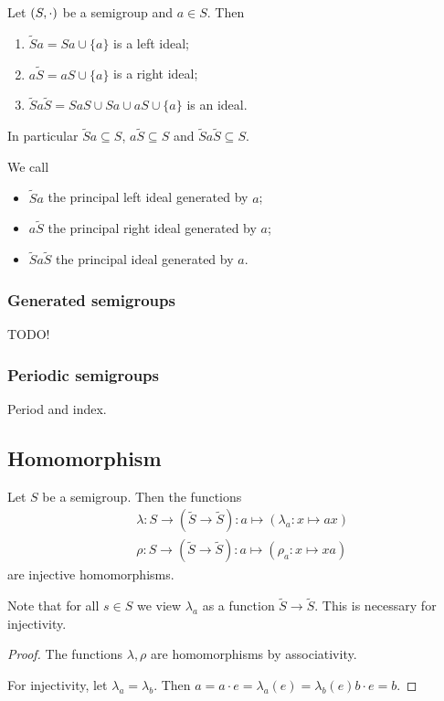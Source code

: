 \begin{lemma}
Let $\left( S,\cdot \right)$ be a semigroup and $a\in S$. Then
\begin{enumerate}
\item $\widetilde{S}a = Sa \cup \{a\}$ is a left ideal;
\item $a\widetilde{S} = aS \cup \{a\}$ is a right ideal;
\item $\widetilde{S}a\widetilde{S} = SaS \cup Sa \cup aS \cup \{a\}$ is an ideal.
\end{enumerate}
In particular $\widetilde{S}a \subseteq S$, $a\widetilde{S} \subseteq S$ and $\widetilde{S}a\widetilde{S} \subseteq S$.
\end{lemma}

\begin{definition}
We call
\begin{itemize}
\item $\widetilde{S}a$ the principal left ideal generated by $a$; 
\item $a\widetilde{S}$ the principal right ideal generated by $a$; 
\item $\widetilde{S}a\widetilde{S}$ the principal ideal generated by $a$.
\end{itemize}
\end{definition}

\subsubsection{Generated semigroups}
TODO!

\subsubsection{Periodic semigroups}
Period and index.

\subsection{Homomorphism}

\begin{proposition}
Let $S$ be a semigroup. Then the functions
\begin{align*}
&\lambda: S \to (\widetilde{S} \to \widetilde{S}) : a\mapsto (\lambda_a: x\mapsto ax) \\
&\rho: S \to (\widetilde{S} \to \widetilde{S}): a\mapsto (\rho_a: x\mapsto xa)
\end{align*}
are injective homomorphisms.
\end{proposition}
Note that for all $s\in S$ we view $\lambda_a$ as a function $\widetilde{S} \to \widetilde{S}$. This is necessary for injectivity.
\begin{proof}
The functions $\lambda, \rho$ are homomorphisms by associativity.

For injectivity, let $\lambda_a = \lambda_b$. Then $a = a\cdot e = \lambda_a(e) = \lambda_b(e) b\cdot e = b$.
\end{proof}

